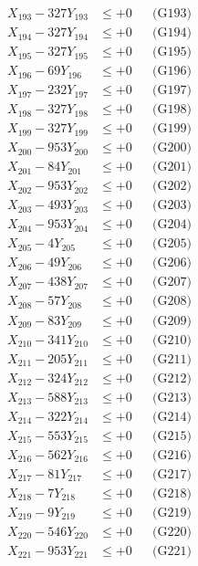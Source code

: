 \documentclass[a4paper,10pt]{article}
\begin{document}
{\begin{align}
X_{193} - 327Y_{193} &\leq +0 && \text{(G193)} \\
X_{194} - 327Y_{194} &\leq +0 && \text{(G194)} \\
X_{195} - 327Y_{195} &\leq +0 && \text{(G195)} \\
X_{196} - 69Y_{196} &\leq +0 && \text{(G196)} \\
X_{197} - 232Y_{197} &\leq +0 && \text{(G197)} \\
X_{198} - 327Y_{198} &\leq +0 && \text{(G198)} \\
X_{199} - 327Y_{199} &\leq +0 && \text{(G199)} \\
X_{200} - 953Y_{200} &\leq +0 && \text{(G200)} \\
\allowbreak
X_{201} - 84Y_{201} &\leq +0 && \text{(G201)} \\
X_{202} - 953Y_{202} &\leq +0 && \text{(G202)} \\
X_{203} - 493Y_{203} &\leq +0 && \text{(G203)} \\
X_{204} - 953Y_{204} &\leq +0 && \text{(G204)} \\
X_{205} - 4Y_{205} &\leq +0 && \text{(G205)} \\
X_{206} - 49Y_{206} &\leq +0 && \text{(G206)} \\
X_{207} - 438Y_{207} &\leq +0 && \text{(G207)} \\
X_{208} - 57Y_{208} &\leq +0 && \text{(G208)} \\
X_{209} - 83Y_{209} &\leq +0 && \text{(G209)} \\
X_{210} - 341Y_{210} &\leq +0 && \text{(G210)} \\
\allowbreak
X_{211} - 205Y_{211} &\leq +0 && \text{(G211)} \\
X_{212} - 324Y_{212} &\leq +0 && \text{(G212)} \\
X_{213} - 588Y_{213} &\leq +0 && \text{(G213)} \\
X_{214} - 322Y_{214} &\leq +0 && \text{(G214)} \\
X_{215} - 553Y_{215} &\leq +0 && \text{(G215)} \\
X_{216} - 562Y_{216} &\leq +0 && \text{(G216)} \\
X_{217} - 81Y_{217} &\leq +0 && \text{(G217)} \\
X_{218} - 7Y_{218} &\leq +0 && \text{(G218)} \\
X_{219} - 9Y_{219} &\leq +0 && \text{(G219)} \\
X_{220} - 546Y_{220} &\leq +0 && \text{(G220)} \\
\allowbreak
X_{221} - 953Y_{221} &\leq +0 && \text{(G221)} \\

\end{align}}
\end{document}
